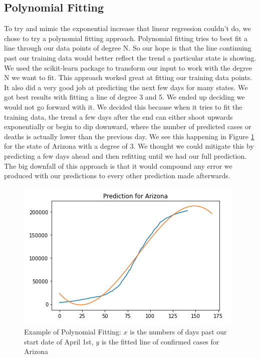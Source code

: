 \documentclass[sigconf,nonacm]{acmart}
\begin{document}
\subsection{Polynomial Fitting}

To try and mimic the exponential increase that linear regression couldn't do,
we chose to try a polynomial fitting approach. Polynomial fitting tries to best
fit a line through our data points of degree N. So our hope is that the line
continuing past our training data would better reflect the trend a particular
state is showing. We used the scikit-learn package to transform our input to
work with the degree N we want to fit\cite{scikit-learn}. This approach worked
great at fitting our training data points. It also did a very good job at
predicting the next few days for many states. We got best results with fitting
a line of degree 3 and 5. We ended up deciding we would not go forward with it.
We decided this because when it tries to fit the training data, the trend a few
days after the end can either shoot upwards exponentially or begin to dip
downward, where the number of predicted cases or deaths is actually lower than
the previous day. We see this happening in Figure \ref{fig:polyfit} for the
state of Arizona with a degree of 3. We thought we could mitigate this by
predicting a few days ahead and then refitting until we had our full
prediction. The big downfall of this approach is that it would compound any
error we produced with our predictions to every other prediction made
afterwards.

\begin{figure}
  \centering
  \includegraphics[width=\linewidth]{figures/7-poly-fit.png}
  \caption{Example of Polynomial Fitting: $x$ is the numbers of days past our
  start date of April 1st, $y$ is the fitted line of confirmed cases for
  Arizona}
  \label{fig:polyfit}
\end{figure}
\end{document}

